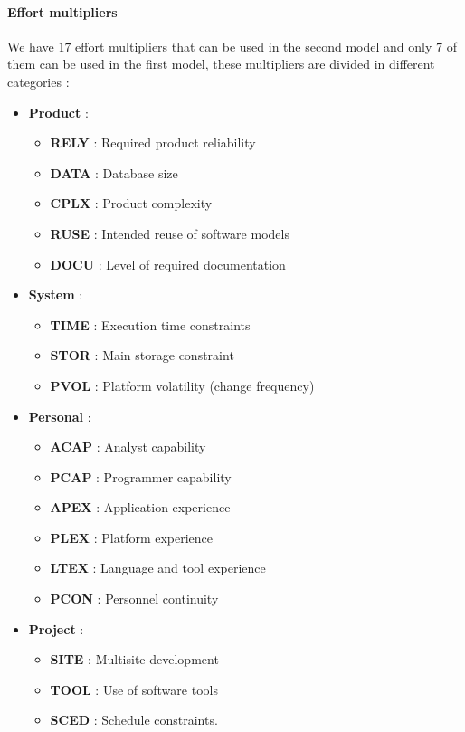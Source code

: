 \paragraph{Effort multipliers} We have $17$ effort multipliers that can be used in the second model and only $7$ of them can be used in the first model, these multipliers are divided in different categories :
\begin{itemize}
    \item \textbf{Product} :
          \begin{itemize}
              \item \textbf{RELY} : Required product reliability
              \item \textbf{DATA} : Database size
              \item \textbf{CPLX} : Product complexity
              \item \textbf{RUSE} : Intended reuse of software models
              \item \textbf{DOCU} : Level of required documentation
          \end{itemize}
    \item \textbf{System} :
          \begin{itemize}
              \item \textbf{TIME} : Execution time constraints
              \item \textbf{STOR} : Main storage constraint
              \item \textbf{PVOL} : Platform volatility (change frequency)
          \end{itemize}
    \item \textbf{Personal} :
          \begin{itemize}
              \item \textbf{ACAP} : Analyst capability
              \item \textbf{PCAP} : Programmer capability
              \item \textbf{APEX} : Application experience
              \item \textbf{PLEX} : Platform experience
              \item \textbf{LTEX} : Language and tool experience
              \item \textbf{PCON} : Personnel continuity
          \end{itemize}
    \item \textbf{Project} :
          \begin{itemize}
              \item \textbf{SITE} : Multisite development
              \item \textbf{TOOL} : Use of software tools
              \item \textbf{SCED} : Schedule constraints.
          \end{itemize}
\end{itemize}
